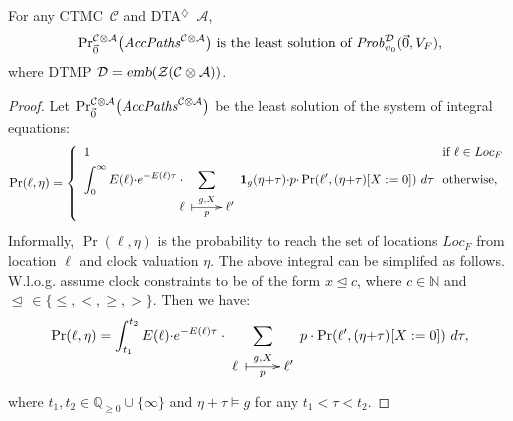 \documentclass{LMCS}
\makeatletter
\newcommand{\mc}[1]{\mathcal{#1}}
\newcommand{\<}{\langle}
\renewcommand{\>}{\rangle}
\newcommand{\CTMC}{\textsc{{CTMC}}}
\newcommand{\DTA}{\textsc{DTA}}
\newcommand{\DTAr}{\DTA$^{\!\Ever}$}
\newcommand{\emb}{\textsl{emb}}
\newcommand{\AccPaths}{{\it AccPaths}}
\newcommand{\Prob}{{\it Prob}}
\newcommand{\F}{\mathop{\diamondsuit}}
\newcommand{\Nats}{\mathbb{N}}
\newcommand{\Rationals}{\mathbb{Q}}
\newcommand{\Ever}{\F}
\newcommand{\updownmapsto}[4]{\xymatrix{#1\;\ar @{|->}[r]^{#2}_{#3}&#4}}
\makeatother
\begin{document}
\begin{thm}\label{th:MTA=DTMP}
For any \CTMC\ $\mc{C}$ and \DTAr\ $\mc{A}$,
$$
{\Pr}^{\mc{C}\otimes \mc{A}}_{\vec{0}}\big(\AccPaths^{\mc{C}\otimes \mc{A}}\big)
\mbox{ is the least solution of } {\Prob}^\mc{D}_{v_0}(\vec{0},V_F),
$$
where DTMP $\mc{D} = \emb(\mc{Z}(\mc{C}\otimes \mc{A}))$.
\end{thm}
\begin{proof}
Let ${\Pr}^{\mc{C}\otimes \mc{A}}_{\vec{0}}\big(\AccPaths^{\mc{C}\otimes \mc{A}}\big)$
be the least solution of the system of integral equations:
\begin{equation*}
\Pr(\ell,\eta) = \left\{ \begin{array}{ll}
1 & \mbox{ if } \ell\in Loc_F \\[1ex]
\displaystyle \int_0^{\infty} E(\ell){\cdot}e^{-E(\ell)\tau} \cdot\!\!\!\!\!
\sum_{\updownmapsto{\ell}{g, X}{p}{\ell'}}
\mathbf{1}_{g}(\eta{+}\tau){\cdot}p{\cdot}\Pr(\ell',(\eta{+}\tau)[X:=0])\ d\tau\!\!\!\!
& \mbox{ otherwise, }
\end{array} \right.
\end{equation*}
Informally, $\Pr(\ell,\eta)$ is the probability to reach the set of locations $Loc_F$ from
location $\ell$ and clock valuation $\eta$.
The above integral can be simplifed as follows.
W.l.o.g. assume clock constraints to be of the form $x \trianglelefteq c$, where $c \in
\Nats$ and $\trianglelefteq \, \in\{\le,<,\ge,>\}$.
Then we have:
\begin{equation*}
\Pr(\ell,\eta) =
\int_{t_1}^{t_2} E(\ell){\cdot}e^{{-}E(\ell)\tau} \cdot
\sum_{\updownmapsto{\ell} {g,X}{p}{\ell'}}p\cdot\Pr(\ell',(\eta{+}\tau)[X:=0])\ d\tau,
\end{equation*}
where $t_1, t_2\in\Rationals_{\geqslant 0}\cup\{\infty\}$ and $\eta{+}\tau \models g$
for any $t_1 < \tau < t_2$.


\end{proof}
\end{document}
